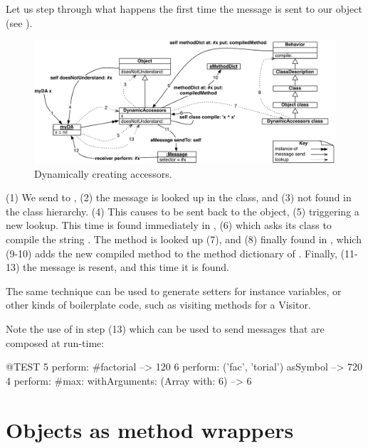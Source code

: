 \documentclass[a4paper,10pt,twoside]{book}
\begin{document}
Let us step through what happens the first time the message  is sent to our object (see ).

\begin{figure}[ht]\centering
	\includegraphics[width=\linewidth]{DynamicAccessors}
	\caption{Dynamically creating accessors.\label{fig:DynamicAccessors} }
\end{figure}

(1) We send  to , (2) the message is looked up in the class, and (3) not found in the class hierarchy. (4) This causes  to be sent back to the object, (5) triggering a new lookup. This time  is found immediately in , (6) which asks its class to compile the string . The  method is looked up (7), and (8) finally found in , which (9-10) adds the new compiled method to the method dictionary of . Finally, (11-13) the message is resent, and this time it is found.

The same technique can be used to generate setters for instance variables, or other kinds of boilerplate code, such as visiting methods for a Visitor.

Note the use of  in step (13) which can be used to send messages that are composed at run-time:

\begin{code}{@TEST}
5 perform: #factorial                                             --> 120
6 perform: ('fac', 'torial') asSymbol                       --> 720
4 perform: #max: withArguments: (Array with: 6) --> 6
\end{code}

\section{Objects as method wrappers}
\label{sec:wrapper}
\end{document}
